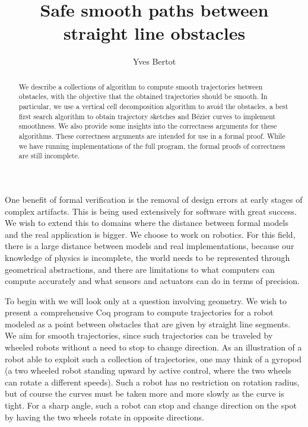 \documentclass{easychair}
\title{Safe smooth paths between straight line obstacles}
\author{Yves Bertot}
\institute{Inria Université Côte d'Azur}
\begin{document}
\maketitle
\begin{abstract}
We describe a collections of algorithm to compute smooth trajectories between
obstacles, with the objective that the obtained trajectories should be
smooth.  In particular, we use a vertical cell decomposition algorithm
to avoid the obstacles, a best first search algorithm to obtain
trajectory sketches and Bézier curves to implement smoothness.  We also
provide some insights into the correctness arguments for these
algorithms.  These correctness arguments are intended for use in a
formal proof.  While we have running implementations of the full
program, the formal proofs of correctness are still incomplete.
\end{abstract}
One benefit of formal verification is the removal of design errors at early
stages of complex artifacts.  This is being used extensively for software
with great success.  We wish to
extend this to domains where the distance between formal models and the
real application is bigger.  We choose to work on robotics.  For this
field, there is a large distance between models and real implementations,
because our knowledge of physics is incomplete,
the world needs to be represented through geometrical abstractions, and
there are limitations to what computers can compute accurately and what
sensors and actuators can do in terms of precision.

To begin with we will look only at a question involving geometry.  We
wish to present a comprehensive Coq program to compute trajectories
for a robot modeled as a point between obstacles that are given by
straight line segments.  We aim for smooth trajectories, since such
trajectories can be traveled by wheeled robots without a need to stop to
change direction.    As an illustration of a robot able to exploit
such a collection of trajectories, one may think of a gyropod (a
two wheeled robot standing upward by active control, where the two
wheels can rotate a different speeds).  Such a robot has no
restriction on rotation radius, but of course the curves must be taken
more and more slowly as the curve is tight.  For a sharp angle, such a
robot can stop and change direction on the spot by having the two
wheels rotate in opposite directions.
\end{document}
